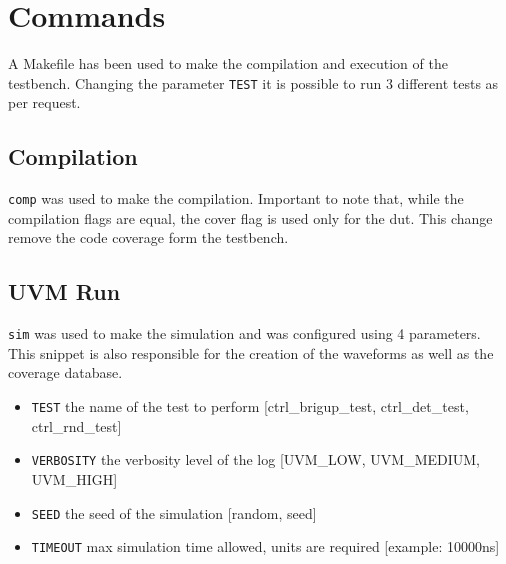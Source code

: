 \chapter{Commands} 
\label{cha:commands}

A Makefile has been used to make the compilation and execution of the testbench.
Changing the parameter \texttt{TEST} it is possible to run 3 different tests as per request.

\section*{Compilation}

\texttt{comp} was used to make the compilation.
Important to note that, while the compilation flags are equal, the cover flag is used only for the dut.
This change remove the code coverage form the testbench.





\vspace{-2mm}
\section*{UVM Run}

\texttt{sim} was used to make the simulation and was configured using 4 parameters.
This snippet is also responsible for the creation of the waveforms as well as the coverage database.


\begin{itemize}
    \item \texttt{TEST} the name of the test to perform [ctrl\_brigup\_test, ctrl\_det\_test, ctrl\_rnd\_test]
    \item \texttt{VERBOSITY} the verbosity level of the log [UVM\_LOW, UVM\_MEDIUM, UVM\_HIGH]
    \item \texttt{SEED} the seed of the simulation [random, seed]
    \item \texttt{TIMEOUT} max simulation time allowed, units are required [example: 10000ns]
\end{itemize}



